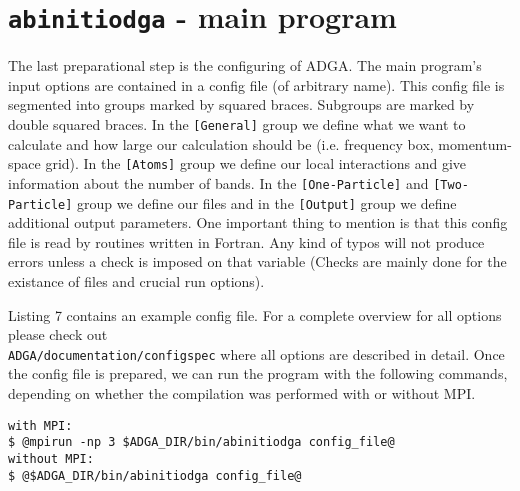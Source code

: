 \documentclass[a4paper,11pt]{article}
\numberwithin{equation}{section} %
\begin{document}
\newpage
\section{\protect\Verb+abinitiodga+ - main program}
The last preparational step is the configuring of ADGA. The main program's input options are contained in a config file (of arbitrary name). This config file is segmented into groups marked by squared braces. Subgroups are marked by double squared braces. In the {\color{red} \verb|[General]|} group we define what we want to calculate and how large our calculation should be (i.e. frequency box, momentum-space grid). In the {\color{red} \verb|[Atoms]|} group we define our local interactions and give information about the number of bands. In the {\color{red} \verb|[One-Particle]|} and {\color{red} \verb|[Two-Particle]|} group we define our files and in the {\color{red} \verb|[Output]|} group we define additional output parameters. One important thing to mention is that this config file is read by routines written in Fortran. Any kind of typos will not produce errors unless a check is imposed on that variable (Checks are mainly done for the existance of files and crucial run options).


Listing 7 contains an example config file.
For a complete overview for all options please check out \\
{\color{blue}\verb|ADGA/documentation/configspec|} where all options are described in detail. Once the config file is prepared, we can run the program with the following commands, depending on whether the compilation was performed with or without MPI.

\begin{lstlisting}[caption=abinitiodga run commands, frame=single, basicstyle=\small, style=base]
with MPI:
$ @mpirun -np 3 $ADGA_DIR/bin/abinitiodga config_file@
without MPI:
$ @$ADGA_DIR/bin/abinitiodga config_file@
\end{lstlisting}
\end{document}
